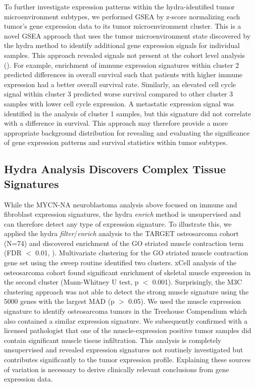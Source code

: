 \documentclass[10pt,letterpaper]{article}
\begin{document}
To further investigate expression patterns within the hydra-identified tumor microenvironment subtypes, we performed GSEA by z-score normalizing each tumor’s gene expression data to its tumor microenvironment cluster. This is a novel GSEA approach that uses the tumor microenvironment state discovered by the hydra method to identify additional gene expression signals for individual samples. This approach revealed signals not present at the cohort level analysis (). For example, enrichment of immune expression signatures within cluster 2 predicted differences in overall survival such that patients with higher immune expression had a better overall survival rate. Similarly, an elevated cell cycle signal within cluster 3 predicted worse survival compared to other cluster 3 samples with lower cell cycle expression. A metastatic expression signal was identified in the analysis of cluster 1 samples, but this signature did not correlate with a difference in survival. This approach may therefore provide a more appropriate background distribution for revealing and evaluating the significance of gene expression patterns and survival statistics within tumor subtypes.


\subsection*{Hydra Analysis Discovers Complex Tissue Signatures}
While the MYCN-NA neuroblastoma analysis above focused on immune and fibroblast expression signatures, the hydra \textit{enrich} method is unsupervised and can therefore detect any type of expression signature. To illustrate this, we applied the hydra \textit{filter}/\textit{enrich} analysis to the TARGET osteosarcoma cohort (N=74) and discovered enrichment of the GO striated muscle contraction term (FDR $<$ 0.01, ). Multivariate clustering for the GO striated muscle contraction gene set using the sweep routine identified two clusters. xCell analysis of the osteosarcoma cohort found significant enrichment of skeletal muscle expression in the second cluster (Mann-Whitney U test, p $<$ 0.001). Surprisingly, the M3C clustering approach was not able to detect the strong muscle signature using the 5000 genes with the largest MAD (p $>$ 0.05). We used the muscle expression signature to identify osteosarcoma tumors in the Treehouse Compendium which also contained a similar expression signature. We subsequently confirmed with a licensed pathologist that one of the muscle-expression positive tumor samples did contain significant muscle tissue infiltration. This analysis is completely unsupervised and revealed expression signatures not routinely investigated but contributes significantly to the tumor expression profile. Explaining these sources of variation is necessary to derive clinically relevant conclusions from gene expression data.
\end{document}
